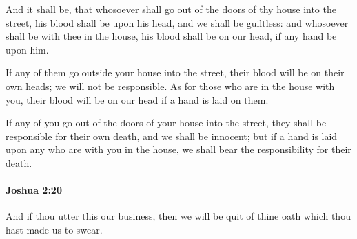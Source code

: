 			\begin{versebox}
					\item[BHS] 
					\item[ASV] And it shall be, that whosoever shall go out of the doors of thy house into the street, his blood shall be upon his head, and we shall be guiltless: and whosoever shall be with thee in the house, his blood shall be on our head, if any hand be upon him.
					\item[NIV] If any of them go outside your house into the street, their blood will be on their own heads; we will not be responsible. As for those who are in the house with you, their blood will be on our head if a hand is laid on them.
					\item[NRSV] If any of you go out of the doors of your house into the street, they shall be responsible for their own death, and we shall be innocent; but if a hand is laid upon any who are with you in the house, we shall bear the responsibility for their death.
			\end{versebox}

		\paragraph{Joshua 2:20} %
			\label{JOSHUA-2-20}

			And if thou utter this our business, then we will be quit of thine oath which thou hast made us to swear.

